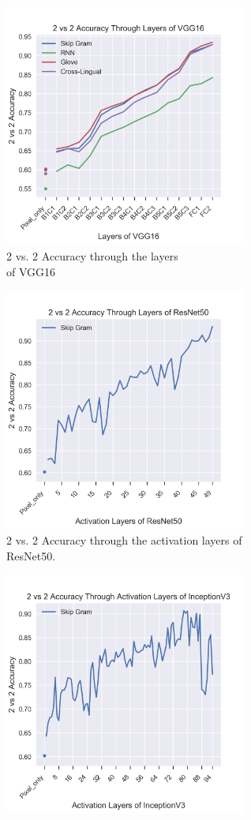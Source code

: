 \begin{figure}[H]
    \centering
    \begin{subfigure}[t]{0.49\textwidth}
        \includegraphics[width=8cm]{Figures/VGG16}
        \caption{2 vs. 2 Accuracy through the layers\\ of VGG16}
        \label{VGG22}
    \end{subfigure}%
    \centering
    \begin{subfigure}[t]{0.49\textwidth}
        \includegraphics[width=8cm]{Figures/ResNet50}
        \centering
        \caption{2 vs. 2 Accuracy through the activation layers of ResNet50.}
        \label{RES22}
    \end{subfigure}
    \begin{subfigure}[t]{0.49\textwidth}
        \includegraphics[width=8cm]{Figures/InceptionV3Activations}

\end{subfigure}
\end{figure}
